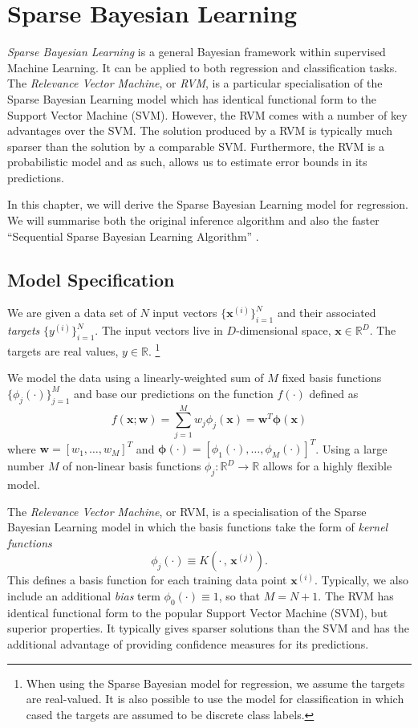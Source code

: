 \chapter{Sparse Bayesian Learning}
\label{ch:rvm}
\emph{Sparse Bayesian Learning} \cite{tipping2001} is a general Bayesian framework within supervised Machine Learning. 
It can be applied to both regression and classification tasks.
The \emph{Relevance Vector Machine}, or \emph{RVM}, is a particular specialisation of the Sparse Bayesian Learning model which has identical functional form to the Support Vector Machine (SVM).
However, the RVM comes with a number of key advantages over the SVM. 
The solution produced by a RVM is typically much sparser than the solution by a comparable SVM.
Furthermore, the RVM is a probabilistic model and as such, allows us to estimate error bounds in its predictions.

In this chapter, we will derive the Sparse Bayesian Learning model for regression.
We will summarise both the original inference algorithm \cite{tipping2001} and also the faster ``Sequential Sparse Bayesian Learning Algorithm'' \cite{tipping2003}.

\section{Model Specification}
We are given a data set of $N$ input vectors $\{\bm x^{(i)}\}^N_{i=1}$ and their associated \emph{targets} $\{y^{(i)}\}_{i=1}^N$.
The input vectors live in $D$-dimensional space, $\bm x \in \mathbb{R}^D$.
The targets are real values, $y \in \mathbb{R}$.
\footnote{When using the Sparse Bayesian model for regression, we assume the targets are real-valued.
  It is also possible to use the model for classification in which cased the targets are assumed to be discrete class labels.
}

We model the data using a linearly-weighted sum of $M$ fixed basis functions $\{\phi_j(\cdot)\}_{j=1}^M$ and base our predictions on the function $f(\cdot)$ defined as
\begin{equation} 
  \label{rvm:function}
  f(\bm x; \bm w) = \sum_{j=1}^M w_j \phi_j(\bm x) = \bm w^T \bm \phi(\bm x)
\end{equation}
where $\bm w = [w_1, \dots, w_M]^T$ and $\bm \phi(\cdot) = [\phi_1(\cdot), \dots, \phi_M(\cdot)]^T$.
Using a large number $M$ of non-linear basis functions $\phi_j : \mathbb{R}^D \to \mathbb{R}$ allows for a highly flexible model. 

The \emph{Relevance Vector Machine}, or RVM, is a specialisation of the Sparse Bayesian Learning model in which the basis functions take the form of \emph{kernel functions} 
\begin{equation*}
  \phi_j(\cdot) \equiv K\left(\cdot\,,\,\bm x^{(j)}\right).
\end{equation*}
This defines a basis function for each training data point $\bm x^{(i)}$.
Typically, we also include an additional \emph{bias} term $\phi_0(\cdot) \equiv 1$, so that $M = N+1$.
The RVM has identical functional form to the popular Support Vector Machine (SVM), but superior properties.
It typically gives sparser solutions than the SVM and has the additional advantage of providing confidence measures for its predictions.

